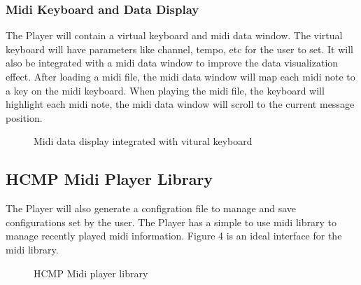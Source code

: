 \documentclass[12pt]{article} %
\begin{document}
\subsubsection{Midi Keyboard and Data Display} %
The Player will contain a virtual keyboard and midi data window. The 
virtual keyboard will have parameters like channel, tempo, etc for the user to set. 
It will also be integrated with a midi data window to improve the data visualization
effect. After loading a midi file, the midi data window will map each midi note to a key on the midi keyboard. 
When playing the midi file, the keyboard will highlight each midi note, the midi data window
will scroll to the current message position.

\begin{figure}[H] %
\caption{Midi data display integrated with vitural keyboard}
\label{fig:speciation}
\end{figure}

\subsection{HCMP Midi Player Library}
The Player will also generate a configration file to manage and 
save configurations set by the user. The Player has a simple to  
use midi library to manage recently played midi information. Figure 4 is an ideal interface
for the midi library.
\begin{figure}[H] %
\caption{HCMP Midi player library}
\label{fig:speciation}
\end{figure}
\end{document}
